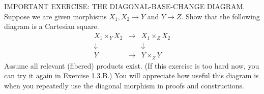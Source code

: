 IMPORTANT EXERCISE: THE DIAGONAL-BASE-CHANGE DIAGRAM. Suppose we are given morphisms $X_1, X_2 \to Y$ and $Y \to Z$. Show that the following diagram is a Cartesian square.
$$\begin{array}{ccc} X_1 \times_Y X_2 &\longrightarrow& X_1 \times_Z X_2 \\ \downarrow && \downarrow \\ Y &\longrightarrow& Y \times_Z Y \end{array}$$
Assume all relevant (fibered) products exist. (If this exercise is too hard now, you can try it again in Exercise 1.3.B.) You will appreciate how useful this diagram is when you repeatedly use the diagonal morphism in proofs and constructions.
